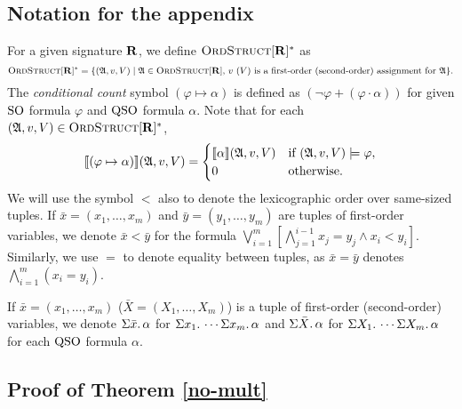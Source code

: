 
\subsection{Notation for the appendix}

For a given signature $\mathbf{R}$, we define $\text{\sc OrdStruct}[\mathbf{R}]^*$ as $$\text{\sc OrdStruct}[\mathbf{R}]^* = \{(\mathfrak{A},v,V) \mid \mathfrak{A}\in\text{\sc OrdStruct}[\mathbf{R}]\text{, $v$ ($V$) is a first-order (second-order) assignment for $\mathfrak{A}$}  \}.$$
The {\em conditional count} symbol $(\varphi \mapsto \alpha)$ is defined as $(\neg\varphi + (\varphi\cdot\alpha))$ for given ${\rm SO}$ formula $\varphi$ and ${\rm QSO}$ formula $\alpha$. Note that for each $(\mathfrak{A},v,V) \in \text{\sc OrdStruct}[\mathbf{R}]^*$, 
$$
{\llbracket{}{(\varphi \mapsto \alpha)}\rrbracket}(\mathfrak{A},v,V) = 
\begin{cases}
{\llbracket{}{\alpha}\rrbracket}(\mathfrak{A},v,V) &\text{if } (\mathfrak{A},v,V)\models\varphi,\\
0 &\text{otherwise}.
\end{cases}
$$
We will use the symbol $<$ also to denote the lexicographic order over same-sized tuples. If $\bar{x} = (x_1,\ldots,x_m)$ and $\bar{y} = (y_1,\ldots,y_m)$ are tuples of first-order variables, we denote $\bar{x} < \bar{y}$ for the formula $\bigvee_{i = 1}^m[\bigwedge_{j = 1}^{i-1}x_j = y_j \wedge x_i < y_i]$. Similarly, we use $=$ to denote equality between tuples, as $\bar{x} = \bar{y}$ denotes $\bigwedge_{i = 1}^m(x_i = y_i)$.

If $\bar{x} = (x_1,\ldots,x_m)$ ($\bar{X} = (X_1,\ldots,X_m)$) is a tuple of first-order (second-order) variables, we denote $\Sigma{\bar{x}}.\,\alpha$ for $\Sigma{x_1}.\,\cdots\Sigma{x_m}.\,\alpha$ and $\Sigma{\bar{X}}.\,\alpha$ for $\Sigma{X_1}.\,\cdots\Sigma{X_m}.\,\alpha$ for each ${\rm QSO}$ formula $\alpha$.
\subsection{Proof of Theorem \ref{no-mult}}


